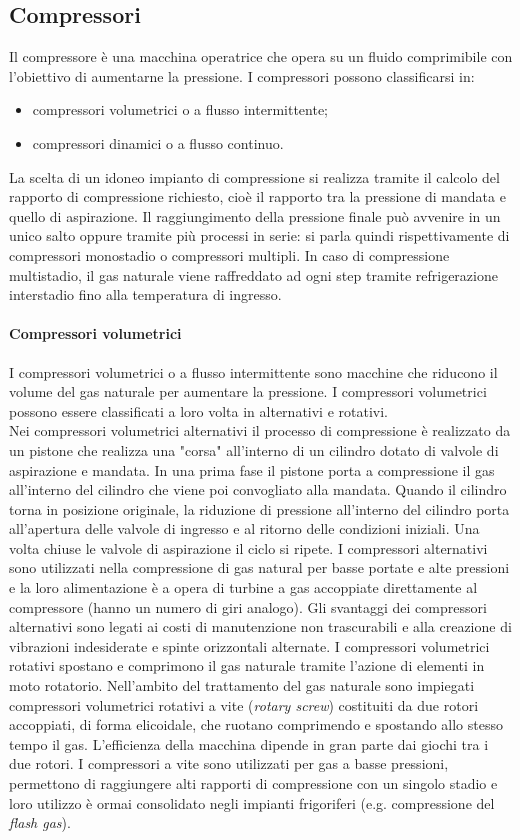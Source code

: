 \subsection{Compressori}
Il compressore è una macchina operatrice che opera su un fluido comprimibile con l'obiettivo di aumentarne la pressione. I compressori possono classificarsi in:
\begin{itemize}
    \item compressori volumetrici o a flusso intermittente;
    \item compressori dinamici o a flusso continuo.
\end{itemize}
 La scelta di un idoneo impianto di compressione si realizza tramite il calcolo del rapporto di compressione richiesto, cioè il rapporto tra la pressione di mandata e quello di aspirazione. Il raggiungimento della pressione finale può avvenire in un unico salto oppure tramite più processi in serie: si parla quindi rispettivamente di compressori monostadio o compressori multipli. In caso di compressione multistadio, il gas naturale viene raffreddato ad ogni step tramite refrigerazione interstadio fino alla temperatura di ingresso.
\paragraph{Compressori volumetrici}
I compressori volumetrici o a flusso intermittente sono macchine che riducono il volume del gas naturale per aumentare la pressione. I compressori volumetrici possono essere classificati a loro volta in alternativi e rotativi.\\
Nei compressori volumetrici alternativi il processo di compressione è realizzato da un pistone che realizza una "corsa" all'interno di un cilindro dotato di valvole di aspirazione e mandata. In una prima fase il pistone porta a compressione il gas all'interno del cilindro che viene poi convogliato alla mandata. Quando il cilindro torna in posizione originale, la riduzione di pressione all'interno del cilindro porta all'apertura delle valvole di ingresso e al ritorno delle condizioni iniziali. Una volta chiuse le valvole di aspirazione il ciclo si ripete. I compressori alternativi sono utilizzati nella compressione di gas natural per basse portate e alte pressioni e la loro alimentazione è a opera di turbine a gas accoppiate direttamente al compressore (hanno un numero di giri analogo). Gli svantaggi dei compressori alternativi sono legati ai costi di manutenzione non trascurabili e alla creazione di vibrazioni indesiderate e spinte orizzontali alternate.
I compressori volumetrici rotativi spostano e comprimono il gas naturale tramite l'azione di elementi in moto rotatorio. Nell'ambito del trattamento del gas naturale sono impiegati compressori volumetrici rotativi a vite (\textit{rotary screw}) costituiti da due rotori accoppiati, di forma elicoidale, che ruotano comprimendo e spostando allo stesso tempo il gas. L'efficienza della macchina dipende in gran parte dai giochi tra i due rotori. I compressori a vite sono utilizzati per gas a basse pressioni, permettono di raggiungere alti rapporti di compressione con un singolo stadio e loro utilizzo è ormai consolidato negli impianti frigoriferi (e.g. compressione del \textit{flash gas}). 

